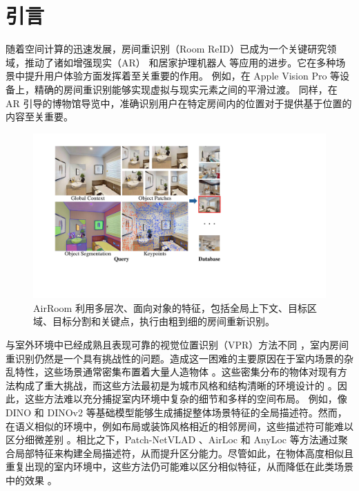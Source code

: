 \vspace{-5pt}
\section{引言}
\label{sec:intro}
\vspace{-2pt}

随着空间计算的迅速发展，房间重识别（Room ReID）已成为一个关键研究领域，推动了诸如增强现实（AR）\cite{schult2023controlroom3droomgenerationusing} 和居家护理机器人 \cite{sarch2022tideetidyingnovelrooms} 等应用的进步。它在多种场景中提升用户体验方面发挥着至关重要的作用。  
例如，在 Apple Vision Pro 等设备上，精确的房间重识别能够实现虚拟与现实元素之间的平滑过渡。  
同样，在 AR 引导的博物馆导览中，准确识别用户在特定房间内的位置对于提供基于位置的内容至关重要。

\begin{figure}[ht]
    \centering
    \includegraphics[width=\columnwidth]{object_information_font.pdf}
    \vspace{-20pt}
    \caption{AirRoom 利用多层次、面向对象的特征，包括全局上下文、目标区域、目标分割和关键点，执行由粗到细的房间重新识别。}
    \vspace{-20pt}
    \label{fig:example_image}
\end{figure}

与室外环境中已经成熟且表现可靠的视觉位置识别（VPR）方法不同 \cite{arandjelović2016netvladcnnarchitectureweakly, hausler2021patchnetvladmultiscalefusionlocallyglobal, keetha2023anylocuniversalvisualplace}，室内房间重识别仍然是一个具有挑战性的问题。造成这一困难的主要原因在于室内场景的杂乱特性，这些场景通常密集布置着大量人造物体 \cite{xu2023clusvprefficientvisualplace}。这些密集分布的物体对现有方法构成了重大挑战，而这些方法最初是为城市风格和结构清晰的环境设计的 \cite{7339473}。因此，这些方法难以充分捕捉室内环境中复杂的细节和多样的空间布局。  
例如，像 DINO \cite{caron2021emergingpropertiesselfsupervisedvision} 和 DINOv2 \cite{oquab2024dinov2learningrobustvisual} 等基础模型能够生成捕捉整体场景特征的全局描述符。然而，在语义相似的环境中，例如布局或装饰风格相近的相邻房间，这些描述符可能难以区分细微差别 \cite{cai2022patchnetvladlearnedpatchdescriptor}。相比之下，Patch-NetVLAD \cite{hausler2021patchnetvladmultiscalefusionlocallyglobal}、AirLoc \cite{aryan2023airlocobjectbasedindoorrelocalization} 和 AnyLoc \cite{keetha2023anylocuniversalvisualplace} 等方法通过聚合局部特征来构建全局描述符，从而提升区分能力。尽管如此，在物体高度相似且重复出现的室内环境中，这些方法仍可能难以区分相似特征，从而降低在此类场景中的效果 \cite{sattler2019understandinglimitationscnnbasedabsolute}。

